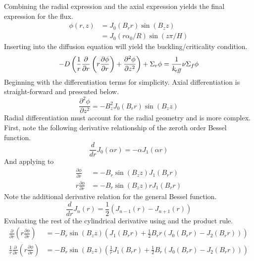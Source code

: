   Combining the radial expression  and the axial 
  expression  yields the final expression for the flux.
  \begin{align} \label{eq:analytic_finite_cyl}
    \phi(r,z) &= J_0(B_r r) \sin(B_z z) \\
    &= J_0(r \alpha_0 / R) \sin(z \pi / H)
  \end{align}
  Inserting  into the diffusion equation will yield 
  the buckling/criticality condition.
  \begin{equation}
    -D \left( \frac{1}{r} \frac{\partial}{\partial r} \left( r 
      \frac{\partial \phi}{\partial r} \right) + \frac{\partial^2 \phi}
      {\partial z^2} \right) + \Sigma_r \phi = \frac{1}{k_{\!\mbox{\scriptsize \em eff}}} \nu 
      \Sigma_f \phi
  \end{equation}
  Beginning with the differentiation terms for simplicity. Axial 
  differentiation is straight-forward and presented below.
  \begin{equation}
    \label{eq:above}
    \frac{\partial^2 \phi}{\partial z^2} = -B_z^2 J_0(B_r r) \sin(B_z z)
  \end{equation}
  Radial differentiation must account for the radial geometry and is more 
  complex. First, note the following derivative relationship of the zeroth
  order Bessel function.
  \begin{equation} \label{eq:deriv_bessel0}
    \frac{d}{dr} J_0(\alpha r) = - \alpha J_1(\alpha r)
  \end{equation}
  And applying  to 
  \begin{align}
    \frac{\partial \phi}{\partial r} &= -B_r \sin(B_z z) J_1(B_r r) \\
    r \frac{\partial \phi}{\partial r} &= -B_r \sin(B_z z) r J_1 (B_r r) 
  \end{align}
  Note the additional derivative relation for the general Bessel function.
  \begin{equation} \label{eq:deriv_besseln}
    \frac{d}{dr} J_n(r) = \frac{1}{2} \left( J_{n-1}(r) - J_{n+1}(r)\right)
  \end{equation}
  Evaluating the rest of the cylindrical derivative using
   and the product rule.
  \begin{align}
    \frac{\partial}{\partial r} \left( r \frac{\partial \phi}{\partial r}
      \right) &= -B_r \sin(B_z z) \left(J_1(B_r r) + \frac{1}{2} B_r r \left(
      J_0(B_r r) - J_2(B_r r) \right) \right) \\
    \frac{1}{r} \frac{\partial}{\partial r} \left(r 
      \frac{\partial \phi}{\partial r} \right) &=
      -B_r \sin(B_z z) \left(\frac{1}{r} J_1(B_r r) + \frac{1}{2} B_r \left(
      J_0(B_r r) - J_2(B_r r) \right) \right)
  \end{align}
